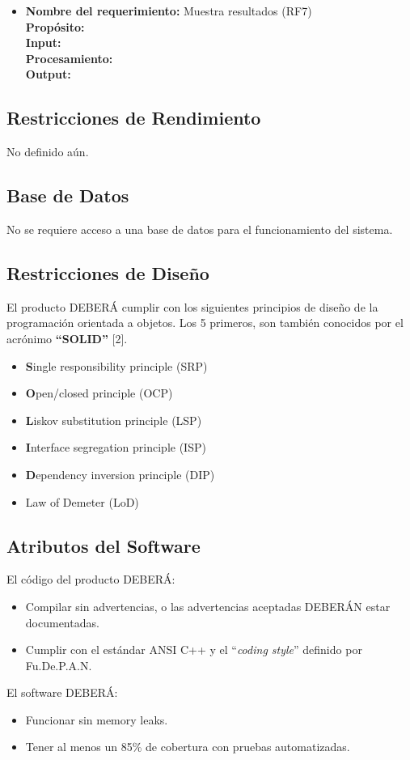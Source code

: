 \documentclass[10pt,a4paper,english,spanish]{article}
\begin{document}
\begin{itemize}
		\item \textbf{Nombre del requerimiento:} Muestra resultados (RF7)\\
			  \textbf{Propósito:} \\
			  \textbf{Input:} \\
			  \textbf{Procesamiento:} \\
			  \textbf{Output:} \\
	\end{itemize}


\subsection{Restricciones de Rendimiento}
	 No definido aún.

\subsection{Base de Datos}
	No se requiere acceso a una base de datos para el funcionamiento del sistema.

\subsection{Restricciones de Diseño}
\par El producto DEBERÁ cumplir con los siguientes principios de diseño de la
programación orientada a objetos. Los 5 primeros, son también conocidos por
el acrónimo \textbf{``SOLID''} [2].
\begin{itemize}
	\item \textbf{S}ingle responsibility principle (SRP)
	\item \textbf{O}pen/closed principle (OCP)
	\item \textbf{L}iskov substitution principle (LSP)
	\item \textbf{I}nterface segregation principle (ISP)
	\item \textbf{D}ependency inversion principle (DIP)	
	\item Law of Demeter (LoD)
\end{itemize}

\subsection{Atributos del Software}
\par El código del producto DEBERÁ:
\begin{itemize}
 \item Compilar sin advertencias, o las advertencias aceptadas DEBERÁN estar documentadas.
 \item Cumplir con el estándar ANSI C++ y el ``\textit{coding style}'' definido por Fu.De.P.A.N.
\end{itemize}
\par El software DEBERÁ:
\begin{itemize}
	\item Funcionar sin memory leaks.
	\item Tener al menos un 85\% de cobertura con pruebas automatizadas.
\end{itemize}
\end{document}
